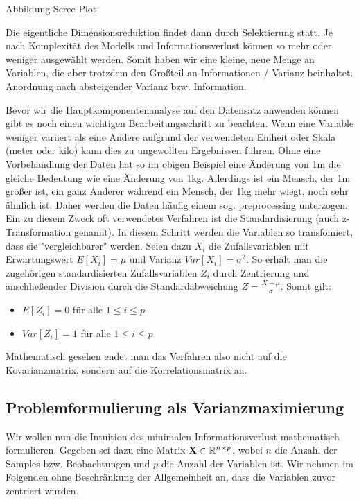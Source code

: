 Abbildung Scree Plot

Die eigentliche Dimensionsreduktion findet dann durch Selektierung statt. Je nach Komplexität des Modells und Informationsverlust können so mehr oder weniger ausgewählt werden. Somit haben wir eine kleine, neue Menge an Variablen, die aber trotzdem den Großteil an Informationen / Varianz beinhaltet. Anordnung nach absteigender Varianz bzw. Information.

Bevor wir die Hauptkomponentenanalyse auf den Datensatz anwenden können gibt es noch einen wichtigen Bearbeitungsschritt zu beachten. Wenn eine Variable weniger variiert als eine Andere aufgrund der verwendeten Einheit oder Skala (meter oder kilo) kann dies zu ungewollten Ergebnissen führen. Ohne eine Vorbehandlung der Daten hat so im obigen Beispiel eine Änderung von 1m die gleiche Bedeutung wie eine Änderung von 1kg. Allerdings ist ein Mensch, der 1m größer ist, ein ganz Anderer während ein Mensch, der 1kg mehr wiegt, noch sehr ähnlich ist. Daher werden die Daten häufig einem sog. preprocessing unterzogen. Ein zu diesem Zweck oft verwendetes Verfahren ist die Standardisierung (auch z-Transformation genannt). In diesem Schritt werden die Variablen so transfomiert, dass sie "vergleichbarer" werden. Seien dazu $X_i$ die Zufallsvariablen mit Erwartungswert $E[X_i] = \mu$ und Varianz $Var[X_i] = \sigma^2$. So erhält man die zugehörigen standardisierten Zufallsvariablen $Z_i$ durch Zentrierung und anschließender Division durch die Standardabweichung $Z = \frac{X-\mu}{\sigma}$. Somit gilt:
\begin{itemize}
\item $E[Z_i] = 0$ für alle $1 \leq i \leq p$
\item $Var[Z_i] = 1$ für alle $1 \leq i \leq p$
\end{itemize}
Mathematisch gesehen endet man das Verfahren also nicht auf die Kovarianzmatrix, sondern auf die Korrelationsmatrix an.

\subsection{Problemformulierung als Varianzmaximierung}

Wir wollen nun die Intuition des minimalen Informationsverlust mathematisch formulieren. Gegeben sei dazu eine Matrix $\mathbf{X} \in \mathbb{R}^{n\times p}$, wobei $n$ die Anzahl der Samples bzw. Beobachtungen und $p$ die Anzahl der Variablen ist. Wir nehmen im Folgenden ohne Beschränkung der Allgemeinheit an, dass die Variablen zuvor zentriert wurden. 

